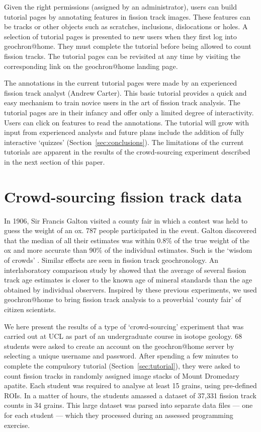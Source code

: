 \documentclass[gchron, manuscript]{copernicus}
\begin{document}
Given the right permissions (assigned by an administrator), users can
build tutorial pages by annotating features in fission track images.
These features can be tracks or other objects such as scratches,
inclusions, dislocations or holes. A selection of tutorial pages is
presented to new users when they first log into
geochron@home. They must complete the tutorial before being
allowed to count fission tracks.  The tutorial pages can be revisited
at any time by visiting the corresponding link on the
geochron@home landing page.\medskip

The annotations in the current tutorial pages were made by an
experienced fission track analyst (Andrew Carter). This basic tutorial
provides a quick and easy mechanism to train novice users in the art
of fission track analysis. The tutorial pages are in their infancy
and offer only a limited degree of interactivity. Users can click on
features to read the annotations. The tutorial will grow with input
from experienced analysts and future plans include the addition of
fully interactive `quizzes' (Section~\ref{sec:conclusions}). The
limitations of the current tutorials are apparent in the results of
the crowd-sourcing experiment described in the next section of this
paper.

\section{Crowd-sourcing fission track data}\label{sec:crowdsourcing}

In 1906, Sir Francis Galton visited a county fair in which a contest
was held to guess the weight of an ox. 787 people participated in the
event. Galton discovered that the median of all their estimates was
within 0.8\% of the true weight of the ox and more accurate than 90\%
of the individual estimates. Such is the `wisdom of crowds'
\citep{galton1907a}. Similar effects are seen in fission track
geochronology. An interlaboratory comparison study by
\citet{miller1985} showed that the average of several fission track
age estimates is closer to the known age of mineral standards than the
age obtained by individual observers. Inspired by these previous
experiments, we used geochron@home to bring fission track analysis to
a proverbial `county fair' of citizen scientists.\medskip

We here present the results of a type of `crowd-sourcing' experiment
that was carried out at UCL as part of an undergraduate course in
isotope geology. 68 students were asked to create an account on the
geochron@home server by selecting a unique username and
password. After spending a few minutes to complete the compulsory
tutorial (Section~\ref{sec:tutorial}), they were asked to count
fission tracks in randomly assigned image stacks of Mount Dromedary
apatite. Each student was required to analyse at least 15 grains,
using pre-defined ROIs. In a matter of hours, the students amassed a
dataset of 37,331 fission track counts in 34 grains.  This large
dataset was parsed into separate data files --- one for each student
--- which they processed during an assessed programming
exercise.\medskip
\end{document}
